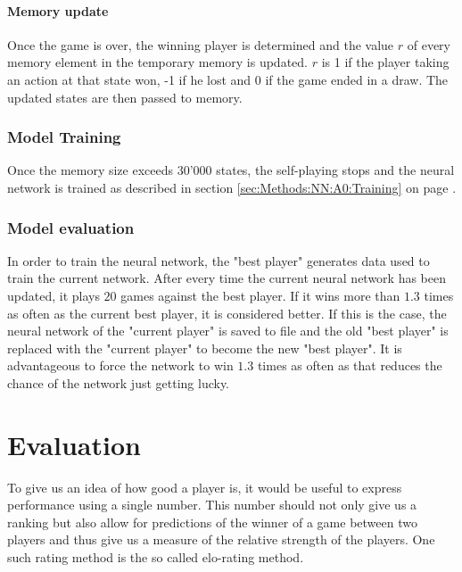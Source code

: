 \documentclass[12pt]{article}
\newcommand{\sectionref}[1]{section \ref{#1} on page \pageref{#1}}
\begin{document}
\paragraph{Memory update}\label{sec:memoryUpdate}
Once the game is over, the winning player is determined and the value \(r\) of every memory element in the temporary memory is updated. \(r\) is 1 if the player taking an action at that state won, -1 if he lost and 0 if the game ended in a draw. The updated states are then passed to memory.

\subsubsection{Model Training}
Once the memory size exceeds 30'000 states, the self-playing stops and the neural network is trained as described in \sectionref{sec:Methods:NN:A0:Training}.

\subsubsection{Model evaluation}\label{sec:modelEvaluation}
In order to train the neural network, the "best player" generates data used to train the current network.
After every time the current neural network has been updated, it plays \(20\) games against the best player. If it wins more than \(1.3\) times as often as the current best player, it is considered better. If this is the case, the neural network of the "current player" is saved to file and the old "best player" is replaced with the "current player" to become the new "best player". It is advantageous to force the network to win \(1.3\) times as often as that reduces the chance of the network just getting lucky. 
\section{Evaluation}
To give us an idea of how good a player is, it would be useful to express performance using a single number. This number should not only give us a ranking but also allow for predictions of the winner of a game between two players and thus give us a measure of the relative strength of the players. One such rating method is the so called elo-rating method. \cite{elo1978rating}
\end{document}
